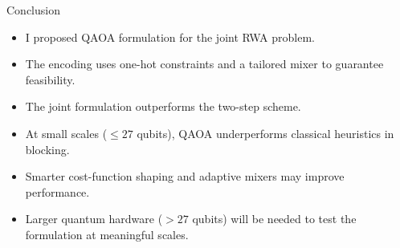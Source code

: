 \begin{frame}{Conclusion}
\begin{itemize}
    \item I proposed QAOA formulation for the joint RWA problem.
    \item The encoding uses one-hot constraints and a tailored mixer to guarantee feasibility.
    \item The joint formulation outperforms the two-step scheme.
    \item At small scales ($\leq 27$ qubits), QAOA underperforms classical heuristics in blocking.
\item Smarter cost-function shaping and adaptive mixers may improve performance.

\item Larger quantum hardware ($> 27$ qubits) will be needed to test the formulation at meaningful scales.
    \end{itemize}
\end{frame}

